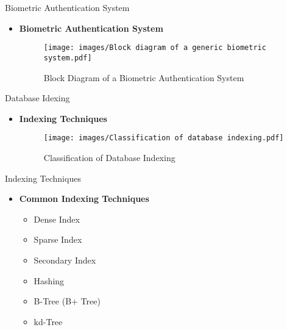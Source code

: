 \begin{frame}[t]{Biometric Authentication System}
	\topline
    \begin{itemize}
    	\item \textcolor{navy_theme}{\textbf{Biometric Authentication System}}
			\begin{figure}[!ht]
				\centering 
				\texttt{[image: images/Block diagram of a generic biometric system.pdf]}
				\caption{Block Diagram of a Biometric Authentication System}
				\label{fig:bio_sys}
			\end{figure}
	\end{itemize}
\end{frame}


\begin{frame}[t]{Database Idexing}
	\topline
    \begin{itemize}
    	\item \textcolor{navy_theme}{\textbf{Indexing Techniques}}
			\begin{figure}[!ht]
				\centering 
				\texttt{[image: images/Classification of database indexing.pdf]}
				\caption{Classification of Database Indexing}
				\label{fig:indexing}
			\end{figure}
	\end{itemize}
\end{frame}

\begin{frame}[t]{Indexing Techniques}
	\topline
    \begin{itemize}
		\item \textcolor{navy_theme}{\textbf{Common Indexing Techniques}}
		\vspace{1em}
			\begin{itemize}
				\setlength\itemsep{1.5em}
				

				\item Dense Index
				\item Sparse Index
				\item Secondary Index
				\item Hashing
				\item B-Tree (B+ Tree)
				\item kd-Tree
			\end{itemize}
	\end{itemize}
\end{frame}

